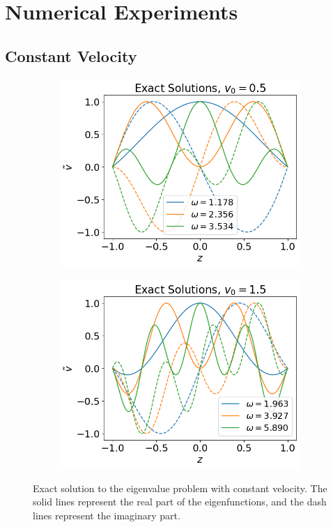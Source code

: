 \chapter{Numerical Experiments}
\section{Constant Velocity}
\begin{figure}[H]
	\centering
	\begin{subfigure}[b]{0.5\textwidth}
		\includegraphics[width=\linewidth]{img/constant_v/exact-v0=0.5}
	\end{subfigure}%
	\begin{subfigure}[b]{0.5\textwidth}
		\includegraphics[width=\linewidth]{img/constant_v/exact-v0=1.5}
	\end{subfigure}
	\caption{Exact solution to the eigenvalue problem with constant velocity. The solid lines represent the real part of the eigenfunctions, and the dash lines represent the imaginary part.}
	\label{fig:exact}
\end{figure}

